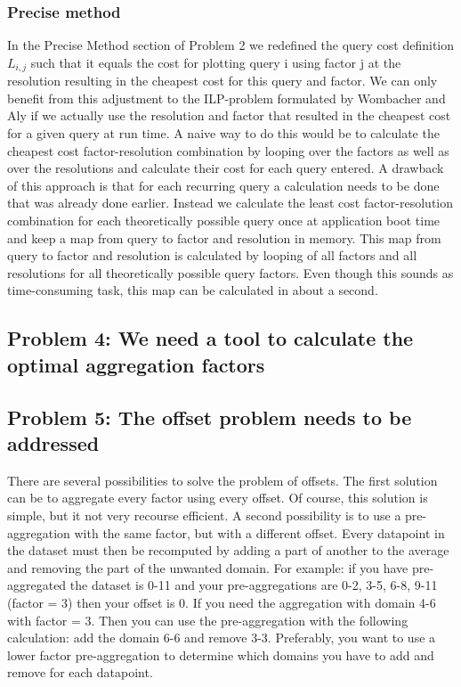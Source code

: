 \subsubsection{Precise method}
In the Precise Method section of Problem 2 we redefined the query cost definition $L_{i,j}$ such that it equals the cost for plotting query i using factor j at the resolution resulting in the cheapest cost for this query and factor. We can only benefit from this adjustment to the ILP-problem formulated by Wombacher and Aly \cite{wombacher2011} if we actually use the resolution and factor that resulted in the cheapest cost for a given query at run time. A naive way to do this would be to calculate the cheapest cost factor-resolution combination by looping over the factors as well as over the resolutions and calculate their cost for each query entered. A drawback of this approach is that for each recurring query a calculation needs to be done that was already done earlier. Instead we calculate the least cost factor-resolution combination for each theoretically possible query once at application boot time and keep a map from query to factor and resolution in memory. This map from query to factor and resolution is calculated by looping of all factors and all resolutions for all theoretically possible query factors. Even though this sounds as time-consuming task, this map can be calculated in about a second.

\subsection{Problem 4: We need a tool to calculate the optimal aggregation factors}
\subsection{Problem 5: The offset problem needs to be addressed}
There are several possibilities to solve the problem of offsets. The first solution can be to aggregate every factor using every offset. Of course, this solution is simple, but it not very recourse efficient. A second possibility is to use a pre-aggregation with the same factor, but with a different offset. Every datapoint in the dataset must then be recomputed by adding a part of another to the average and removing the part of the unwanted domain. For example: if you have pre-aggregated the dataset is 0-11 and your pre-aggregations are 0-2, 3-5, 6-8, 9-11 (factor = 3) then your offset is 0. If you need the aggregation with domain 4-6 with factor = 3. Then you can use the pre-aggregation with the following calculation: add the domain 6-6 and remove 3-3. Preferably, you want to use a lower factor pre-aggregation to determine which domains you have to add and remove for each datapoint.


